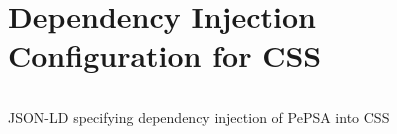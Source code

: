 \section{Dependency Injection Configuration for CSS}
\label{appendix:css-config}

\begin{code}
\inputminted[linenos,tabsize=2,breaklines]{json}{code/css-config.json}
\caption{JSON-LD specifying dependency injection of PePSA into \acrshort{CSS}}
\label{listing:css-config}
\end{code}